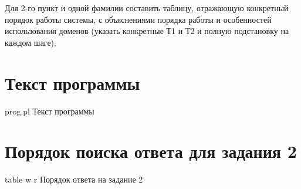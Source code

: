 Для 2-го пункт и одной фамилии составить таблицу, отражающую конкретный порядок работы системы, с объяснениями порядка работы и особенностей использования доменов (указать конкретные Т1 и Т2 и полную подстановку на каждом шаге).

\clearpage

\section{Текст программы}

    {prog.pl}
    {Текст программы}

{\large\section*{Порядок поиска ответа для задания 2}}

    {table}
    {w}
    {r}
    {\linewidth}
    {Порядок ответа на задание 2}

